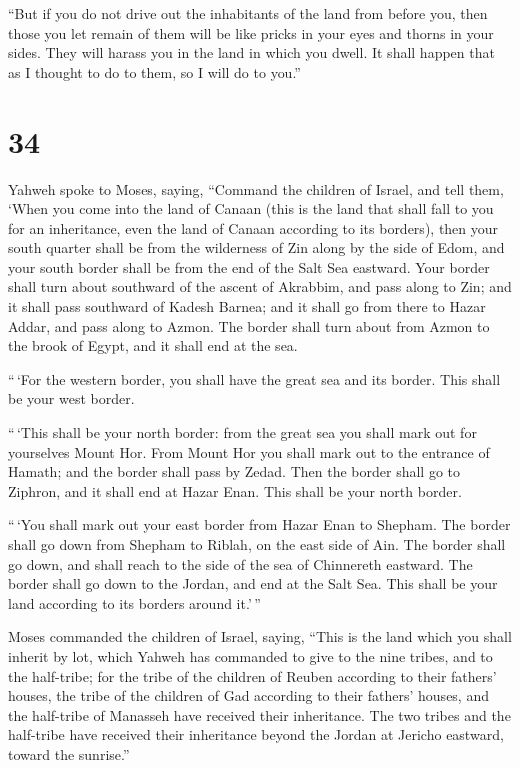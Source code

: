  ``But if you do not drive out the inhabitants of the land
from before you, then those you let remain of them will be like pricks
in your eyes and thorns in your sides. They will harass you in the land
in which you dwell.  It shall happen that as I thought to
do to them, so I will do to you.''

\hypertarget{section-33}{%
\section{34}\label{section-33}}

 Yahweh spoke to Moses, saying,  ``Command the
children of Israel, and tell them, `When you come into the land of
Canaan (this is the land that shall fall to you for an inheritance, even
the land of Canaan according to its borders),  then your
south quarter shall be from the wilderness of Zin along by the side of
Edom, and your south border shall be from the end of the Salt Sea
eastward.  Your border shall turn about southward of the
ascent of Akrabbim, and pass along to Zin; and it shall pass southward
of Kadesh Barnea; and it shall go from there to Hazar Addar, and pass
along to Azmon.  The border shall turn about from Azmon to
the brook of Egypt, and it shall end at the sea.

 ``\,`For the western border, you shall have the great sea
and its border. This shall be your west border.

 ``\,`This shall be your north border: from the great sea
you shall mark out for yourselves Mount Hor.  From Mount Hor
you shall mark out to the entrance of Hamath; and the border shall pass
by Zedad.  Then the border shall go to Ziphron, and it shall
end at Hazar Enan. This shall be your north border.

 ``\,`You shall mark out your east border from Hazar Enan
to Shepham.  The border shall go down from Shepham to
Riblah, on the east side of Ain. The border shall go down, and shall
reach to the side of the sea of Chinnereth eastward.  The
border shall go down to the Jordan, and end at the Salt Sea. This shall
be your land according to its borders around it.'\,''

 Moses commanded the children of Israel, saying, ``This is
the land which you shall inherit by lot, which Yahweh has commanded to
give to the nine tribes, and to the half-tribe;  for the
tribe of the children of Reuben according to their fathers' houses, the
tribe of the children of Gad according to their fathers' houses, and the
half-tribe of Manasseh have received their inheritance. 
The two tribes and the half-tribe have received their inheritance beyond
the Jordan at Jericho eastward, toward the sunrise.''

